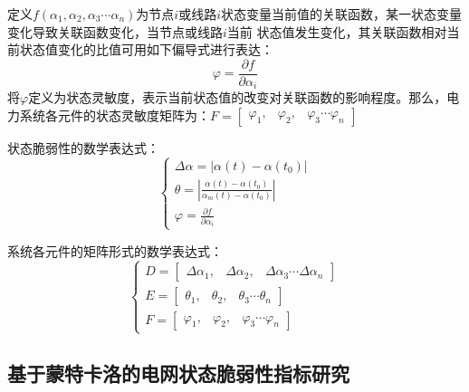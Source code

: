定义$f\left(\alpha_{1}, \alpha_{2}, \alpha_{3} \cdots \alpha_{n}\right)$为节点$i$或线路$i$状态变量当前值的关联函数，某一状态变量变化导致关联函数变化，当节点或线路$i$当前
状态值发生变化，其关联函数相对当前状态值变化的比值可用如下偏导式进行表达：
\begin{equation}
  \varphi=\frac{\partial f}{\partial \alpha_{i}}
  \end{equation}
将$\varphi$定义为状态灵敏度，表示当前状态值的改变对关联函数的影响程度。那么，电力系统各元件的状态灵敏度矩阵为：$F=\left[\begin{array}{lll}{\varphi_{1},} & {\varphi_{2},} & {\varphi_{3} \cdots \varphi_{n}}\end{array}\right]$

状态脆弱性的数学表达式：
  \begin{equation}
  \left\{\begin{array}{l}{\Delta \alpha=\left|\alpha(t)-\alpha\left(t_{0}\right)\right|} \\
   {\theta=\left|\frac{\alpha(t)-\alpha\left(t_{0}\right)}{\alpha_{m}(t)-\alpha\left(t_{0}\right)}\right|} \\
   {\varphi=\frac{\partial f}{\partial \alpha_{i}}}\end{array}\right.
  \end{equation}
  
系统各元件的矩阵形式的数学表达式：
\begin{equation}
  \left\{\begin{array}{l}{D=\left[\begin{array}{lll}{\Delta \alpha_{1},} & {\Delta \alpha_{2},} & {\Delta \alpha_{3} \cdots \Delta \alpha_{n}}\end{array}\right]} \\
   {E=\left[\begin{array}{lll}{\theta_{1},} & {\theta_{2},} & {\theta_{3} \cdots \theta_{n}}\end{array}\right]} \\
   {F=\left[\begin{array}{lll}{\varphi_{1},} & {\varphi_{2},} & {\varphi_{3} \cdots \varphi_{n}}\end{array}\right]}\end{array}\right.
  \end{equation}

\subsection{基于蒙特卡洛的电网状态脆弱性指标研究}
\label{sec:vulneStaus}





